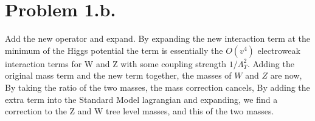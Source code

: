 \documentclass{article}
\begin{document}
\section*{Problem 1.b.}
Add the new operator and expand.
By expanding the new interaction term at the minimum of the Higgs potential the term is essentially the $O(v^4)$ electroweak interaction terms for W and Z with some coupling strength $1/\Lambda^2_T$. Adding the original mass term  and the new term together, the masses of $W$ and $Z$ are now,
By taking the ratio of the two masses, the mass correction cancels,
By adding the extra term  into the Standard Model lagrangian and expanding, we find a correction to the Z and W tree level masses, and this  of the two masses.
\end{document}
